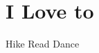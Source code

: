 \begin{aside}
    ~
    ~
    ~
    ~
    ~
    ~
    ~
    ~
    ~
    ~
    ~
    ~
    ~
    ~
    \section{I Love to}
    Hike
    Read
    Dance
    ~
\end{aside}